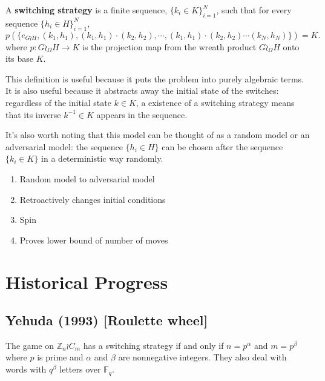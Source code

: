 \begin{definition}
  A \textbf{switching strategy} is a finite sequence, $\{k_i \in K\}_{i=1}^N$,
  such that for every sequence ${\{h_i \in H\}_{i=1}^N}$,
  \[
    p(\{e_{G \wr H}, (k_1, h_1), (k_1, h_1)\cdot(k_2, h_2), \cdots, (k_1, h_1)\cdot(k_2, h_2)\cdots(k_N, h_N)\}) = K.
  \]
  where $p \colon G \wr_\Omega H \rightarrow K$ is the projection map from the
  wreath product $G \wr_\Omega H$ onto its base $K$.
\end{definition}


This definition is useful because it puts the problem into purely algebraic
terms. It is also useful because it abstracts away the initial state of the
switches: regardless of the initial state $k \in K$, a existence of a switching strategy
means that its inverse $k^{-1} \in K$ appears in the sequence.

It's also worth noting that this model can be thought of as a random model or an
adversarial model: the sequence $\{h_i \in H\}$ can be chosen after the sequence
$\{k_i \in K\}$ in a deterministic way randomly.


\begin{enumerate}
  \item Random model to adversarial model
  \item Retroactively changes initial conditions
  \item Spin
  \item Proves lower bound of number of moves
\end{enumerate}

%
%
\section{Historical Progress}
\label{sec:HistoricalProgress}
\subsection{Yehuda (1993) [Roulette wheel]}
\begin{theorem}
  The game on $\mathbb Z_{n} \wr C_{m}$ has a switching strategy if and only if
  $n = p^\alpha$ and $m = p^\beta$ where $p$ is prime and $\alpha$ and $\beta$
  are nonnegative integers. They also deal with words with $q^\beta$ letters
  over $\mathbb F_q$.
\end{theorem}
